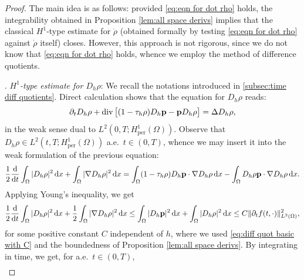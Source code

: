 \documentclass[11pt,a4paper,reqno]{amsart}
\theoremstyle{remark}
\theoremstyle{definition}
\numberwithin{equation}{section}
\newcommand{\per}{\mathrm{per}}
\DeclareMathOperator{\dv}{div}
\newcommand{\p}{{\bf p}}
\renewcommand{\d}{\, \mathrm{d} }
\newcommand{\der}{\mathrm{d}}
\begin{document}
\begin{proof}
    The main idea is as follows: provided \eqref{eq:eqn for dot rho} holds, the integrability obtained in Proposition \ref{lem:all space derivs} implies that the classical $H^1$-type estimate for $\dot{\rho}$ (obtained formally by testing \eqref{eq:eqn for dot rho} against $\dot{\rho}$ itself) closes. However, this approach is not rigorous, since we do not know that \eqref{eq:eqn for dot rho} holds, whence we employ the method of difference quotients. 
    

    \smallskip 

    . \textit{$H^1$-type estimate for $D_h \rho$}: We recall the notations introduced in \ref{subsec:time diff quotients}. Direct calculation shows that the equation for $D_h \rho$ reads: 
    \begin{equation}\label{eq:diff quot eq for Dh rho}
        \partial_t D_h \rho + \dv\big[ (1-\tau_h\rho)D_h \p - \p D_h \rho \big] = \Delta D_h \rho, 
    \end{equation}
   in the weak sense dual to $L^2(0,T;H^1_\per(\Omega))$. Observe that $D_h \rho \in L^2(t,T;H^1_\per(\Omega))$ a.e.~$t \in (0,T)$, whence we may insert it into the weak formulation of the previous equation: 
    \begin{equation*}
        \begin{aligned}
            \frac{1}{2}\frac{\der}{\der t}\int_\Omega |D_h \rho |^2 \d x + \int_\Omega |\nabla D_h \rho |^2 \d x = \int_\Omega (1-\tau_h \rho) D_h \p \cdot \nabla D_h \rho \d x - \int_\Omega D_h \rho \p \cdot \nabla D_h \rho \d x. 
        \end{aligned}
    \end{equation*}
    Applying Young's inequality, we get 
        \begin{equation*}
        \begin{aligned}
            \frac{1}{2}\frac{\der}{\der t}\int_\Omega |D_h \rho |^2 \d x + \frac{1}{2}\int_\Omega |\nabla D_h \rho |^2 \d x \leq  \int_\Omega |D_h \p|^2 \d x + \int_\Omega |D_h \rho|^2 \d x \leq C\Vert \partial_t f(t,\cdot) \Vert^2_{L^2(\Omega)}, 
        \end{aligned}
    \end{equation*}
  for some positive constant $C$ independent of $h$, where we used \eqref{eq:diff quot basic with C} and the boundedness of Proposition \ref{lem:all space derivs}. By integrating in time, we get, for a.e.~$t\in(0,T)$, 
          \begin{equation*}
        \begin{aligned}

\end{aligned}
\end{equation*}
\end{proof}
\end{document}

